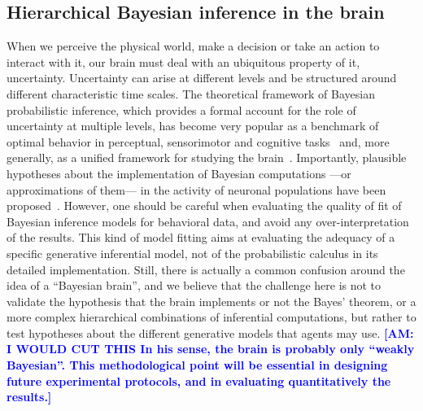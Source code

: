 \documentclass[10pt,letterpaper]{article}
\newcommand{\citep}[1]{\cite{#1}}
\newcommand{\AM}[1]{\textbf{\textcolor{blue}{[AM: #1]}}}
\begin{document}
\subsection{Hierarchical Bayesian inference in the brain}
When we perceive the physical world, make a decision or take an action to interact with it, our brain must deal with an ubiquitous property of it, uncertainty. Uncertainty can arise at different levels and be structured around different characteristic time scales. %
The theoretical framework of Bayesian probabilistic inference, which provides a formal account for the role of uncertainty at multiple levels, %
has become very popular as a benchmark of optimal behavior in perceptual, sensorimotor and cognitive tasks~\citep{KnillPouget2004} and, more generally, as a unified framework for studying the brain~\citep{Friston2010}. Importantly, plausible hypotheses about the implementation of Bayesian computations ---or approximations of them--- in the activity of neuronal populations have been proposed~\citep{Bastos12, Fetsch2012,Ma2006}. However, one should be careful when evaluating the quality of fit of Bayesian inference models for behavioral data, and avoid any over-interpretation of the results. This kind of model fitting aims at evaluating the adequacy of a specific generative inferential model, not of the probabilistic calculus in its detailed implementation.
Still, there is actually a common confusion around the idea of a ``Bayesian brain'', and
we believe that the challenge here is not to validate the hypothesis that the brain implements or not the Bayes' theorem, or a more complex hierarchical combinations of inferential computations, but rather to test hypotheses about the different generative models
that agents may use.
\AM{I WOULD CUT THIS In his sense, the brain is probably only ``weakly Bayesian''. This methodological point will be essential in designing future experimental protocols, and in evaluating quantitatively the results.}
\end{document}
